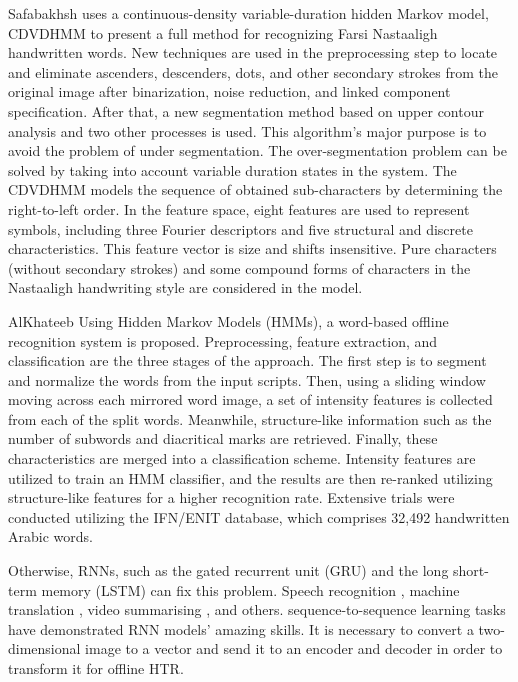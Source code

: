 \documentclass[preprint,12pt]{elsarticle}
\begin{document}
Safabakhsh \cite{safabakhsh2005nastaaligh} uses a continuous-density variable-duration hidden Markov model, CDVDHMM \cite{chen1995variable} to present a full method for recognizing Farsi Nastaaligh handwritten words. New techniques are used in the preprocessing step to locate and eliminate ascenders, descenders, dots, and other secondary strokes from the original image after binarization, noise reduction, and linked component specification. After that, a new segmentation method based on upper contour analysis and two other processes is used. This algorithm's major purpose is to avoid the problem of under segmentation. The over-segmentation problem can be solved by taking into account variable duration states in the system. The CDVDHMM models the sequence of obtained sub-characters by determining the right-to-left order. In the feature space, eight features are used to represent symbols, including three Fourier descriptors and five structural and discrete characteristics. This feature vector is size and shifts insensitive. Pure characters (without secondary strokes) and some compound forms of characters in the Nastaaligh handwriting style are considered in the model. 

AlKhateeb \cite{alkhateeb2011offline} Using Hidden Markov Models (HMMs), a word-based offline recognition system is proposed. Preprocessing, feature extraction, and classification are the three stages of the approach. The first step is to segment and normalize the words from the input scripts. Then, using a sliding window moving across each mirrored word image, a set of intensity features is collected from each of the split words. Meanwhile, structure-like information such as the number of subwords and diacritical marks are retrieved. Finally, these characteristics are merged into a classification scheme. Intensity features are utilized to train an HMM classifier, and the results are then re-ranked utilizing structure-like features for a higher recognition rate. Extensive trials were conducted utilizing the IFN/ENIT database, which comprises 32,492 handwritten Arabic words.

Otherwise, RNNs, such as the gated recurrent unit (GRU) \cite{chung2014empirical} and the long short-term memory (LSTM) \cite{hochreiter1997long} can fix this problem. Speech recognition \cite{hannun2014deep}, machine translation \cite{sutskever2014sequence}, video summarising \cite{srivastava2015unsupervised}, and others. sequence-to-sequence learning tasks have demonstrated RNN models' amazing skills. It is necessary to convert a two-dimensional image to a vector and send it to an encoder and decoder in order to transform it for offline HTR. 
\end{document}
